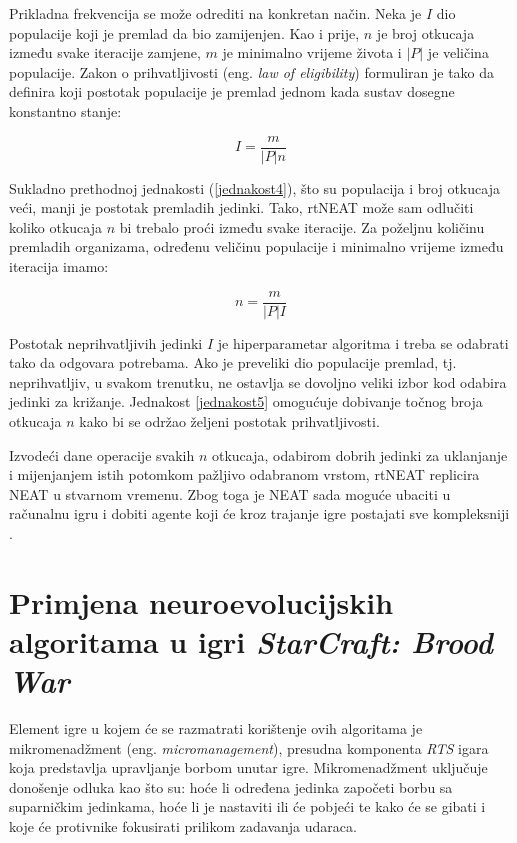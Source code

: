 \documentclass[times, utf8, seminar, numeric]{fer}
\begin{document}
Prikladna frekvencija se može odrediti na konkretan način. Neka je $I$ dio populacije koji je premlad da bio zamijenjen. Kao i prije, $n$ je broj otkucaja između svake iteracije zamjene, $m$ je minimalno vrijeme života i $|P|$ je veličina populacije. Zakon o prihvatljivosti (eng. \textit{law of eligibility}) formuliran je tako da definira koji postotak populacije je premlad jednom kada sustav dosegne konstantno stanje:

\begin{equation}
I = \frac{m}{|P|n}
\label{jednakost4}
\end{equation}

Sukladno prethodnoj jednakosti (\ref{jednakost4}), što su populacija i broj otkucaja veći, manji je postotak premladih jedinki. Tako, rtNEAT može sam odlučiti koliko otkucaja $n$ bi trebalo proći između svake iteracije. Za poželjnu količinu premladih organizama, određenu veličinu populacije i minimalno vrijeme između iteracija imamo:

\begin{equation}
n = \frac{m}{|P|I}
\label{jednakost5}
\end{equation}

Postotak neprihvatljivih jedinki $I$ je hiperparametar algoritma i treba se odabrati tako da odgovara potrebama. Ako je preveliki dio populacije premlad, tj. neprihvatljiv, u svakom trenutku, ne ostavlja se dovoljno veliki izbor kod odabira jedinki za križanje. Jednakost \ref{jednakost5} omogućuje dobivanje točnog broja otkucaja $n$ kako bi se održao željeni postotak prihvatljivosti.

Izvodeći dane operacije svakih $n$ otkucaja, odabirom dobrih jedinki za uklanjanje i mijenjanjem istih potomkom pažljivo odabranom vrstom, rtNEAT replicira NEAT u stvarnom vremenu. Zbog toga je NEAT sada moguće ubaciti u računalnu igru i dobiti agente koji će kroz trajanje igre postajati sve kompleksniji \citep{rad4}.

\chapter{Primjena neuroevolucijskih algoritama u igri \textit{StarCraft: Brood War}}
Element igre u kojem će se razmatrati korištenje ovih algoritama je mikromenadžment (eng. \textit{micromanagement}), presudna komponenta \textit{RTS} igara koja predstavlja upravljanje borbom unutar igre. Mikromenadžment uključuje donošenje odluka kao što su: hoće li određena jedinka započeti borbu sa suparničkim jedinkama, hoće li je nastaviti ili će pobjeći te kako će se gibati i koje će protivnike fokusirati prilikom zadavanja udaraca.
\end{document}
